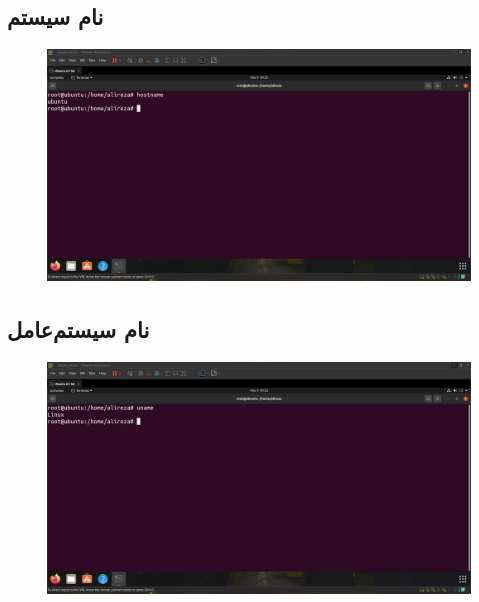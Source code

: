 \documentclass{article}
\begin{document}
\subsection{نام سیستم}
\begin{figure}[H]
    \centering
    \includegraphics[width=1.0\textwidth]{figures/2b.jpg}
    \caption
	{
	}
    \label{fig:fig1}
\end{figure}

\subsection{نام سیستم‌عامل}
\begin{figure}[H]
    \centering
    \includegraphics[width=1.0\textwidth]{figures/2c.jpg}
    \caption
	{
	}
    \label{fig:fig1}
\end{figure}
\end{document}
